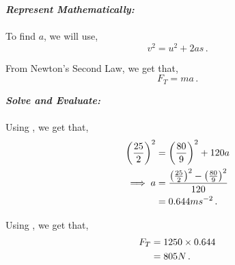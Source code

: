 \begin{subquestions}
	
	
\textbf{\textit{Represent Mathematically:}} \\ \\
To find $a$, we will use,
\begin{equation}
	v^2=u^2+2as \label{2006:q5:AEqn1} \,.
\end{equation}

From Newton's Second Law, we get that,
\begin{equation}
	F_T = ma \label{2006:q5:FEqn1} \,.
\end{equation}




\textbf{\textit{Solve and Evaluate:}} \\ \\
Using , we get that,
\begin{align}
	\left(\frac{25}{2}\right)^2 & = \left(\frac{80}{9}\right)^2 + 120a \nonumber \\
	\implies a & = \frac{\left(\frac{25}{2}\right)^2-\left(\frac{80}{9}\right)^2}{120} \nonumber \\
	           & = 0.644ms^{-2} \,.
\end{align}

Using , we get that,
\begin{align}
	F_T & = 1250 \times 0.644 \nonumber \\
	    & = 805N \,.
\end{align}

\end{subquestions}